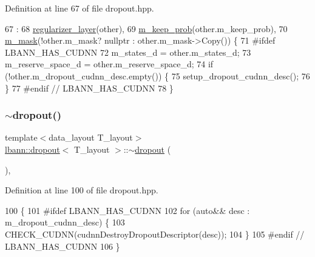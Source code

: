 Definition at line 67 of file dropout.\+hpp.


\begin{DoxyCode}
67                                 :
68     \hyperlink{classlbann_1_1regularizer__layer_a2ebf3877b905b479a0250b74cf8f68b3}{regularizer\_layer}(other),
69     \hyperlink{classlbann_1_1dropout_aa06cbee70f3426b589990889b8ac8872}{m\_keep\_prob}(other.m\_keep\_prob),
70     \hyperlink{classlbann_1_1dropout_ad7d359957d41adcb64e6e3a2d4ad278d}{m\_mask}(!other.m\_mask? \textcolor{keyword}{nullptr} : other.m\_mask->Copy()) \{
71 \textcolor{preprocessor}{  #ifdef LBANN\_HAS\_CUDNN}
72     m\_states\_d = other.m\_states\_d;
73     m\_reserve\_space\_d = other.m\_reserve\_space\_d;
74     \textcolor{keywordflow}{if} (!other.m\_dropout\_cudnn\_desc.empty()) \{
75       setup\_dropout\_cudnn\_desc();
76     \}
77 \textcolor{preprocessor}{  #endif // LBANN\_HAS\_CUDNN}
78   \}
\end{DoxyCode}
\mbox{\label{classlbann_1_1dropout_a4b18d1195a176f4dd653767bfc0a9f6b}} 
\subsubsection{\texorpdfstring{$\sim$dropout()}{~dropout()}}
{\footnotesize\ttfamily template$<$data\+\_\+layout T\+\_\+layout$>$ \\
\hyperlink{classlbann_1_1dropout}{lbann\+::dropout}$<$ T\+\_\+layout $>$\+::$\sim$\hyperlink{classlbann_1_1dropout}{dropout} (\begin{DoxyParamCaption}{ }\end{DoxyParamCaption})\hspace{0.3cm}{\ttfamily [inline]}, {\ttfamily [override]}}



Definition at line 100 of file dropout.\+hpp.


\begin{DoxyCode}
100                       \{
101 \textcolor{preprocessor}{  #ifdef LBANN\_HAS\_CUDNN}
102     \textcolor{keywordflow}{for} (\textcolor{keyword}{auto}&& desc : m\_dropout\_cudnn\_desc) \{
103       CHECK\_CUDNN(cudnnDestroyDropoutDescriptor(desc));
104     \}
105 \textcolor{preprocessor}{  #endif // LBANN\_HAS\_CUDNN}
106   \}
\end{DoxyCode}



